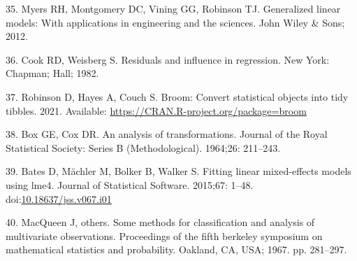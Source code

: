 \documentclass[10pt,letterpaper]{article}
\begin{document}
\leavevmode\hypertarget{ref-myers2012generalized}{}%
35. Myers RH, Montgomery DC, Vining GG, Robinson TJ. Generalized linear
models: With applications in engineering and the sciences. John Wiley \&
Sons; 2012.

\leavevmode\hypertarget{ref-cook1982residuals}{}%
36. Cook RD, Weisberg S. Residuals and influence in regression. New
York: Chapman; Hall; 1982.

\leavevmode\hypertarget{ref-robinson2021broom}{}%
37. Robinson D, Hayes A, Couch S. Broom: Convert statistical objects
into tidy tibbles. 2021. Available:
\url{https://CRAN.R-project.org/package=broom}

\leavevmode\hypertarget{ref-box1964analysis}{}%
38. Box GE, Cox DR. An analysis of transformations. Journal of the Royal
Statistical Society: Series B (Methodological). 1964;26: 211--243.

\leavevmode\hypertarget{ref-bates2015lme4}{}%
39. Bates D, Mächler M, Bolker B, Walker S. Fitting linear mixed-effects
models using lme4. Journal of Statistical Software. 2015;67: 1--48.
doi:\href{https://doi.org/10.18637/jss.v067.i01}{10.18637/jss.v067.i01}

\leavevmode\hypertarget{ref-macqueen1967some}{}%
40. MacQueen J, others. Some methods for classification and analysis of
multivariate observations. Proceedings of the fifth berkeley symposium
on mathematical statistics and probability. Oakland, CA, USA; 1967. pp.
281--297.

\nolinenumbers
\end{document}
